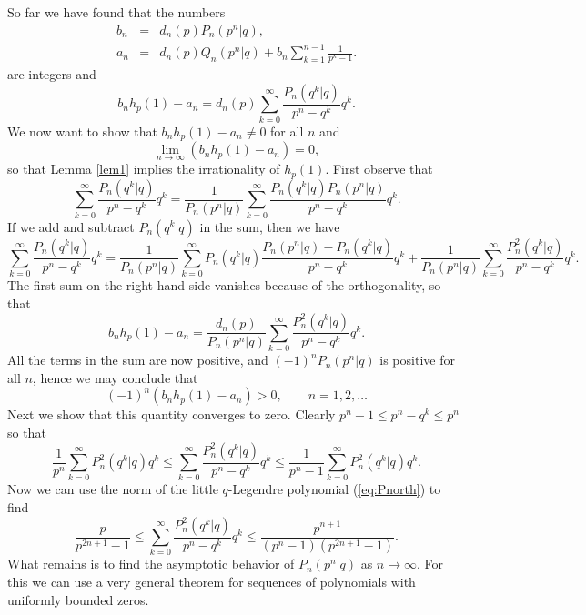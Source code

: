\documentclass[12pt]{article}
\begin{document}
So far we have found that the numbers
\begin{eqnarray}
   b_n & = &  d_n(p) P_n(p^n|q), \label{eq:bn} \\
     a_n & = &  d_n(p) Q_n(p^n|q) +
      b_n \sum_{k=1}^{n-1} \frac{1}{p^k-1} .       \label{eq:an}
\end{eqnarray}
are integers and         
\begin{equation}
   b_n h_p(1) - a_n =  d_n(p) \sum_{k=0}^\infty
      \frac{P_n(q^k|q)}{p^n-q^k} q^k.
\end{equation}
We now want to show that $b_n h_p(1)-a_n \neq 0$ for all $n$ and
\[  \lim_{n \to \infty} ( b_n h_p(1) - a_n ) = 0, \]
so that Lemma \ref{lem1} implies the irrationality of $h_p(1)$.
First observe that
\[  \sum_{k=0}^\infty
      \frac{P_n(q^k|q)}{p^n-q^k} q^k = \frac{1}{P_n(p^n|q)}
      \sum_{k=0}^\infty
      \frac{P_n(q^k|q)P_n(p^n|q)}{p^n-q^k} q^k. \]
 If we add and subtract $P_n(q^k|q)$ in the sum, then we have
\[  \sum_{k=0}^\infty
      \frac{P_n(q^k|q)}{p^n-q^k} q^k =
       \frac{1}{P_n(p^n|q)}
      \sum_{k=0}^\infty P_n(q^k|q) \frac{P_n(p^n|q)-P_n(q^k|q)}{p^n-q^k} q^k
+ \frac{1}{P_n(p^n|q)}
      \sum_{k=0}^\infty
      \frac{P_n^2(q^k|q)}{p^n-q^k} q^k. \]
The first sum on the right hand side vanishes because 
of the orthogonality, so that      
\begin{equation}  \label{eq:error}
   b_n h_p(1) - a_n = \frac{d_n(p)}{P_n(p^n|q)} \sum_{k=0}^\infty
      \frac{P_n^2(q^k|q)}{p^n-q^k} q^k. 
\end{equation}
All the terms in the sum are now positive, and $(-1)^n P_n(p^n|q)$
is positive for all $n$, hence we may conclude that
\[   (-1)^n (b_n h_p(1)-a_n) > 0, \qquad n=1,2,\ldots \]
Next we show that this quantity converges to zero. Clearly
$p^n-1 \leq p^n-q^k \leq p^n$ so that
\[     \frac{1}{p^n} \sum_{k=0}^\infty
      P_n^2(q^k|q) q^k \leq
\sum_{k=0}^\infty \frac{P_n^2(q^k|q)}{p^n-q^k} q^k \leq
      \frac{1}{p^n-1} \sum_{k=0}^\infty
      P_n^2(q^k|q) q^k . \]
Now we can use the norm of the little $q$-Legendre polynomial (\ref{eq:Pnorth}) to find
\begin{equation}  \label{eq:bounds}
 \frac{p}{p^{2n+1}-1} \leq
\sum_{k=0}^\infty \frac{P_n^2(q^k|q)}{p^n-q^k} q^k \leq
  \frac{p^{n+1}}{(p^n-1)(p^{2n+1}-1)}. 
\end{equation}
 What remains is to find the
 asymptotic behavior of $P_n(p^n|q)$ as $n \to \infty$. For this we can
use a very general theorem for sequences of polynomials with uniformly
bounded zeros.
\end{document}
